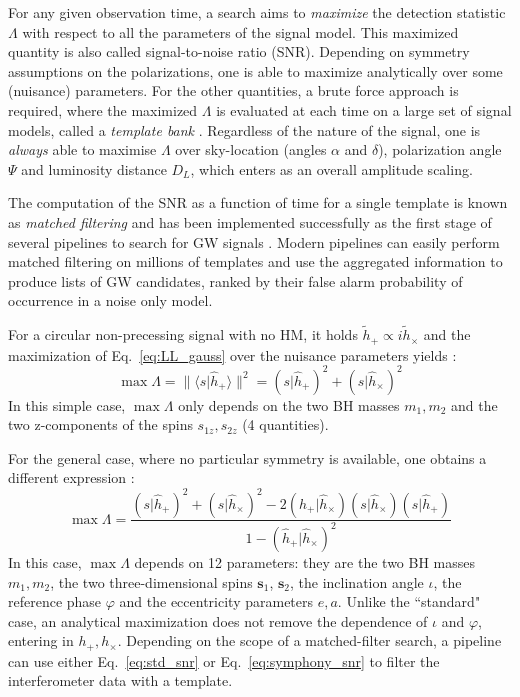 \documentclass[twocolumn,showpacs,preprintnumbers,nofootinbib,prd,
superscriptaddress,10pt]{revtex4-2}
\newcommand{\scalar}[2]{\langle #1|#2 \rangle}
\newcommand{\rescalar}[2]{( #1 |#2 )}
\begin{document}
For any given observation time, a search aims to {\it maximize} the detection statistic $\Lambda$ with respect to all the parameters of the signal model. This maximized quantity is also called signal-to-noise ratio (SNR).
Depending on symmetry assumptions on the polarizations, one is able to maximize analytically over some (nuisance) parameters.
For the other quantities, a brute force approach is required, where the maximized $\Lambda$ is evaluated at each time on a large set of signal models, called a {\it template bank} \cite{PhysRevD.77.104017, Mukherjee:2018yra}.
Regardless of the nature of the signal, one is {\it always} able to maximise $\Lambda$ over sky-location (angles $\alpha$ and $\delta$), polarization angle $\Psi$ and luminosity distance $D_L$, which enters as an overall amplitude scaling.

The computation of the SNR as a function of time for a single template is known as {\it matched filtering} and has been implemented successfully as the first stage of several pipelines to search for GW signals \cite{Allen:2005fk, Privitera:2013xza, Usman:2015kfa, Capano:2016dsf, PhysRevD.95.042001, Nitz:2017svb, gstlal_paper2, Aubin:2020goo, Chu:2020pjv}. Modern pipelines can easily perform matched filtering on millions of templates and use the aggregated information to produce lists of GW candidates, ranked by their false alarm probability of occurrence in a noise only model.

For a circular non-precessing signal with no HM, it holds $\tilde{h}_+ \propto i\tilde{h}_\times$ and the maximization of Eq.~\eqref{eq:LL_gauss} over the nuisance parameters yields \cite{Maggiore:2007ulw}:
\begin{equation}\label{eq:std_snr}
	\max \Lambda = \lVert \scalar{s}{\hat{h}_+} \rVert^2 = \rescalar{s}{\hat{h}_+}^2 + \rescalar{s}{\hat{h}_\times}^2
\end{equation}
In this simple case, $\max\Lambda$ only depends on the two BH masses $m_1, m_2$ and the two z-components of the spins $s_{1z}, s_{2z}$ (4 quantities).

For the general case, where no particular symmetry is available, one obtains a different expression \cite{Capano:2013raa, Schmidt:2014iyl, Harry:2017weg}:
\begin{equation}\label{eq:symphony_snr}
	\max \Lambda = \frac{ \rescalar{s}{\hat{h}_+}^2 + \rescalar{s}{\hat{h}_\times}^2 -2\rescalar{\hat{h}_+}{\hat{h}_\times}\rescalar{s}{\hat{h}_\times}\rescalar{s}{\hat{h}_+}}{1- \rescalar{\hat{h}_+}{\hat{h}_\times}^2}
\end{equation}
In this case, $\max\Lambda$ depends on 12 parameters: they are the two BH masses $m_1, m_2$, the two three-dimensional spins $\mathbf{s}_1$, $\mathbf{s}_2$, the inclination angle $\iota$, the reference phase $\varphi$ and the eccentricity parameters $e, a$.
Unlike the ``standard" case, an analytical maximization does not remove the dependence of $\iota$ and $\varphi$, entering in $h_+, h_\times$.
%
Depending on the scope of a matched-filter search, a pipeline can use either Eq.~\eqref{eq:std_snr} or Eq.~\eqref{eq:symphony_snr} to filter the interferometer data with a template.
\end{document}
